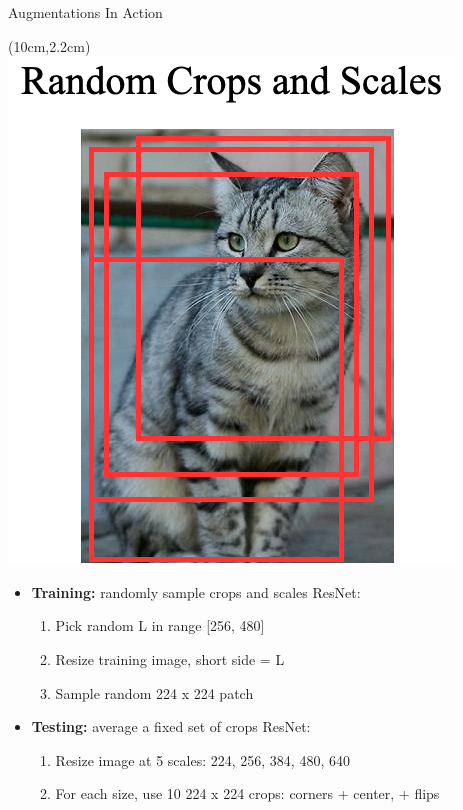 \documentclass[serif, aspectratio=169]{beamer}
\begin{document}
\begin{frame}{Augmentations In Action}
	\begin{textblock*}{5cm}(10cm,2.2cm) %
		\includegraphics[keepaspectratio, scale=0.28]{pic/crop}
	\end{textblock*}

	\begin{itemize}
	\item \textbf{Training:} randomly sample crops and scales \newline ResNet:
		\begin{enumerate}
				\item Pick random L in range [256, 480]
				\item Resize training image, short side = L
				\item Sample random 224 x 224 patch
		\end{enumerate}
		
	\item \textbf{Testing:} average a fixed set of crops \newline ResNet:
		\begin{enumerate}
			\item Resize image at 5 scales: {224, 256, 384, 480, 640}
			\item For each size, use 10 224 x 224 crops:  corners + center, + flips
		\end{enumerate}				
	\end{itemize}
\end{frame}
\end{document}
